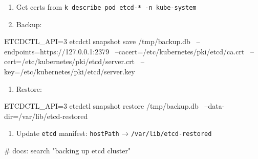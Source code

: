 \begin{tcbitemize}[
  raster columns=2, raster equal height=rows,
  blanker, cheat subtitle
]
\begin{tcbitemize}[
      raster columns=1, raster equal height=rows,
      blanker, cheat subtitle
    ]
      \tcbitem
          {\fontsize{6.5}{7.5}\selectfont\sffamily
          \begin{enumerate}[leftmargin=1.2em, itemsep=0pt, parsep=0pt, topsep=1pt]
            \item Get certs from \texttt{k describe pod etcd-* -n kube-system}
            \item Backup:
          \end{enumerate}}
          \begin{cheatcodebash}
          ETCDCTL_API=3 etcdctl snapshot save /tmp/backup.db \
            --endpoints=https://127.0.0.1:2379 \
            --cacert=/etc/kubernetes/pki/etcd/ca.crt \
            --cert=/etc/kubernetes/pki/etcd/server.crt \
            --key=/etc/kubernetes/pki/etcd/server.key
          \end{cheatcodebash}
          \vspace{-0.5ex}
          {\fontsize{6.5}{7.5}\selectfont\sffamily
          \begin{enumerate}[leftmargin=1.2em, itemsep=0pt, parsep=0pt, topsep=1pt, start=3]
            \item Restore:
          \end{enumerate}}
          \begin{cheatcodebash}
          ETCDCTL_API=3 etcdctl snapshot restore /tmp/backup.db \
            --data-dir=/var/lib/etcd-restored
          \end{cheatcodebash}
          \vspace{-0.5ex}
          {\fontsize{6.5}{7.5}\selectfont\sffamily
          \begin{enumerate}[leftmargin=1.2em, itemsep=0pt, parsep=0pt, topsep=1pt, start=4]
            \item Update \texttt{etcd} manifest: \texttt{hostPath} → \texttt{/var/lib/etcd-restored}
          \end{enumerate}}
          \begin{cheatcodebash}
          # docs: search "backing up etcd cluster"
          \end{cheatcodebash}

    \end{tcbitemize}


\end{tcbitemize}
